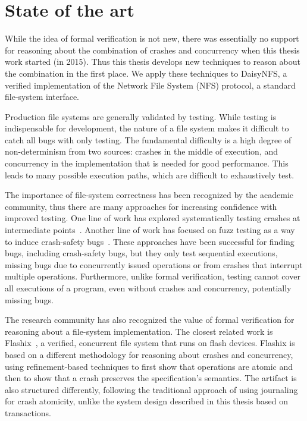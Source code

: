 \section{State of the art}
\label{sec:intro:related}

While the idea of formal verification is not new, there was essentially no
support for reasoning about the combination of crashes and concurrency when this
thesis work started (in 2015). Thus this thesis develops new techniques to
reason about the combination in the first place. We apply these techniques to
DaisyNFS, a verified implementation of the Network File System (NFS) protocol, a
standard file-system interface.

Production file systems are generally validated by testing. While testing is
indispensable for development, the nature of a file system makes it difficult to
catch all bugs with only testing. The fundamental difficulty is a high degree of
non-determinism from two sources: crashes in the middle of execution, and
concurrency in the implementation that is needed for good performance. This
leads to many possible execution paths, which are difficult to exhaustively test.

The importance of file-system correctness has been recognized by the academic
community, thus there are many approaches for increasing confidence with
improved testing. One line of work has explored systematically testing crashes
at intermediate points~\cite{mohan:crashmonkey,pillai:appcrash,yang:explode}. Another line of
work has focused on fuzz testing as a way to induce crash-safety
bugs~\cite{xu:janus,kim:hydra}. These approaches have been successful for
finding bugs, including crash-safety bugs, but they only test sequential
executions, missing bugs due to concurrently issued operations or from crashes
that interrupt multiple operations. Furthermore, unlike formal verification, testing cannot
cover all executions of a program, even without crashes and concurrency,
potentially missing bugs.

The research community has also recognized the value of formal verification for
reasoning about a file-system implementation. The closest related work is
Flashix~\cite{bodenmuller:concurrent-flashix}, a verified, concurrent file
system that runs on flash devices. Flashix is based on a different methodology for
reasoning about crashes and concurrency, using refinement-based techniques to
first show that operations are atomic and then to show that a crash preserves
the specification's semantics. The artifact is also structured differently,
following the traditional approach of using journaling for crash atomicity,
unlike the system design described in this thesis based on transactions.

